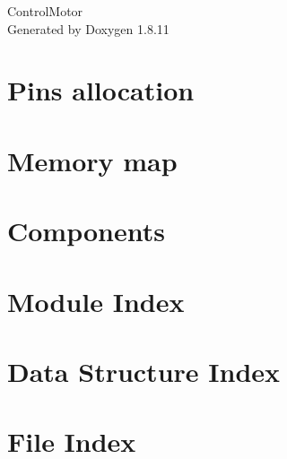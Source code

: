 \documentclass[twoside]{book}
\newcommand{\+}{\discretionary{\mbox{\scriptsize$\hookleftarrow$}}{}{}}
\newcommand{\clearemptydoublepage}{%
  \newpage{\pagestyle{empty}\cleardoublepage}%
}
\begin{document}
\hypersetup{pageanchor=false,
             bookmarksnumbered=true,
             pdfencoding=unicode
            }
\begin{titlepage}
\vspace*{7cm}
\begin{center}%
{\Large Control\+Motor }\\
\vspace*{1cm}
{\large Generated by Doxygen 1.8.11}\\
\end{center}
\end{titlepage}
\clearemptydoublepage
\tableofcontents
\clearemptydoublepage
{}
\hypersetup{pageanchor=true}

\chapter{Pins allocation}
\label{page_pinalloc}
\hypertarget{page_pinalloc}{}

\chapter{Memory map}
\label{page_memorymap}
\hypertarget{page_memorymap}{}

\chapter{Components}
\label{page_components}
\hypertarget{page_components}{}

\chapter{Module Index}

\chapter{Data Structure Index}

\chapter{File Index}

\end{document}
